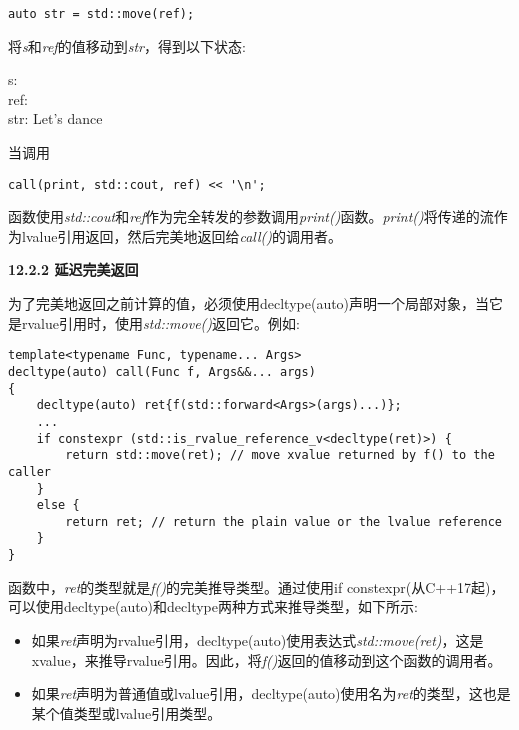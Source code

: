 \begin{lstlisting}[caption={}]
auto str = std::move(ref);
\end{lstlisting}

将\textit{s}和\textit{ref}的值移动到\textit{str}，得到以下状态:\par

\begin{tcolorbox}[colback=white,colframe=black]
s: \\
ref: \\
str: Let's dance
\end{tcolorbox}

当调用\par

\begin{lstlisting}[caption={}]
call(print, std::cout, ref) << '\n';
\end{lstlisting}

函数使用\textit{std::cout}和\textit{ref}作为完全转发的参数调用\textit{print()}函数。\textit{print()}将传递的流作为lvalue引用返回，然后完美地返回给\textit{call()}的调用者。\par

\hspace*{\fill} \par %
\textbf{12.2.2 延迟完美返回}

为了完美地返回之前计算的值，必须使用decltype(auto)声明一个局部对象，当它是rvalue引用时，使用\textit{std::move()}返回它。例如:\par

\begin{lstlisting}[caption={}]
template<typename Func, typename... Args>
decltype(auto) call(Func f, Args&&... args)
{
	decltype(auto) ret{f(std::forward<Args>(args)...)};
	...
	if constexpr (std::is_rvalue_reference_v<decltype(ret)>) {
		return std::move(ret); // move xvalue returned by f() to the caller
	}
	else {
		return ret; // return the plain value or the lvalue reference
	}
}
\end{lstlisting}

函数中，\textit{ret}的类型就是\textit{f()}的完美推导类型。通过使用if constexpr(从C++17起)，可以使用decltype(auto)和decltype两种方式来推导类型，如下所示:\par

\begin{itemize}
	\item 如果\textit{ret}声明为rvalue引用，decltype(auto)使用表达式\textit{std::move(ret)}，这是xvalue，来推导rvalue引用。因此，将\textit{f()}返回的值移动到这个函数的调用者。
	\item 如果\textit{ret}声明为普通值或lvalue引用，decltype(auto)使用名为\textit{ret}的类型，这也是某个值类型或lvalue引用类型。
\end{itemize}

